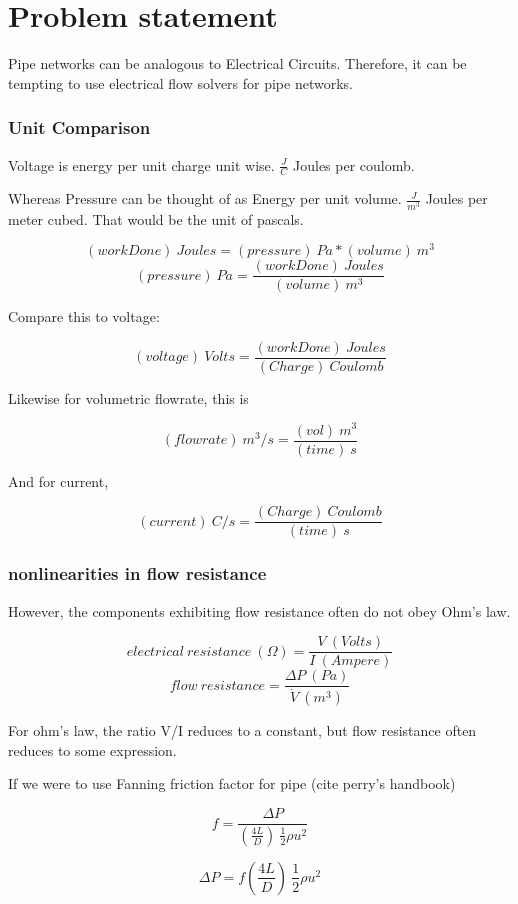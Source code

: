 \documentclass[12pt]{article}
\renewcommand{\_}{\kern-1.5pt\textunderscore\kern-1.5pt}
\begin{document}
\tableofcontents

\part{Problem statement}

Pipe networks can be analogous to Electrical Circuits. Therefore, it can be tempting to use electrical flow solvers for pipe networks.

\section{Unit Comparison}

Voltage is energy per unit charge unit wise. $\frac{J}{C}$ Joules per coulomb.

Whereas Pressure can be thought of as Energy per unit volume. $\frac{J}{m^3}$ Joules per meter cubed. That would be the unit of pascals.

$$(workDone)\ Joules = (pressure)\ Pa * (volume)\ m^3$$
$$(pressure)\ Pa = \frac{(workDone)\ Joules}{(volume)\ m^3}$$

Compare this to voltage:

$$(voltage)\ Volts = \frac{(workDone)\ Joules}{(Charge)\ Coulomb}$$

Likewise for volumetric flowrate, this is

$$(flowrate)\ m^3/s = \frac{(vol)\ m^3}{(time)\ s}$$

And for current,

$$(current)\ C/s = \frac{(Charge)\ Coulomb}{(time)\ s}$$

\section{nonlinearities in flow resistance}

However, the components exhibiting flow resistance often do not obey Ohm's law.

$$electrical\ resistance\ (\Omega) = \frac{V\ (Volts)}{I\ (Ampere)}$$
$$flow\ resistance = \frac{\Delta P\ (Pa)}{\dot{V}\ (m^3)}$$


For ohm's law, the ratio V/I reduces to a constant, but flow resistance often reduces to some expression. 

If we were to use Fanning friction factor for pipe (cite perry's handbook)

$$f = \frac{\Delta P}{ (\frac{4L}{D}) \  \frac{1}{2} \rho u^2 }$$

$$\Delta P = f  (\frac{4L}{D}) \  \frac{1}{2} \rho u^2 $$
\end{document}

